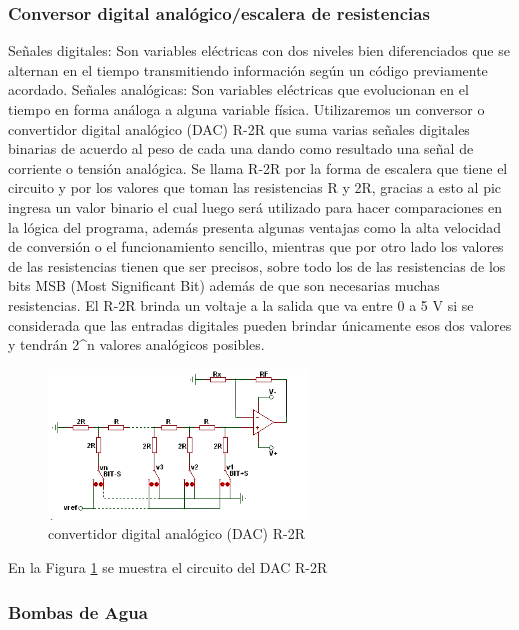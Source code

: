 \documentclass[a4paper]{article}
\begin{document}
\subsubsection*{Conversor digital analógico/escalera de resistencias}

Señales digitales: Son variables eléctricas con dos niveles bien diferenciados que se alternan en el tiempo transmitiendo información según un código previamente acordado.
Señales analógicas: Son variables eléctricas que evolucionan en el tiempo en forma análoga a alguna variable física.
Utilizaremos un conversor o convertidor digital analógico (DAC) R-2R que suma varias señales digitales binarias de acuerdo al peso de cada una dando como resultado una señal de corriente o tensión analógica. Se llama R-2R por la forma de escalera que tiene el circuito y por los valores que toman las resistencias R y 2R, gracias a esto al pic ingresa un valor binario el cual luego será utilizado para hacer comparaciones en la lógica del programa, además presenta algunas ventajas como la alta velocidad de conversión o el funcionamiento sencillo, mientras que por otro lado los valores de las resistencias tienen que ser precisos, sobre todo los de las resistencias de los bits MSB (Most Significant Bit) además de que son necesarias muchas resistencias. El R-2R brinda un voltaje a la salida que va entre 0 a 5 V si se considerada que las entradas digitales pueden brindar únicamente esos dos valores y tendrán 2^n valores analógicos posibles.


\begin{figure}[h]\centering
    \includegraphics[height=4cm]{conversor.png}
    \caption{convertidor digital analógico (DAC) R-2R}
    \label{fig:conversor}
\end{figure}

En la Figura \ref{fig:conversor} se muestra el circuito del DAC R-2R


\subsubsection*{Bombas de Agua}
\end{document}
